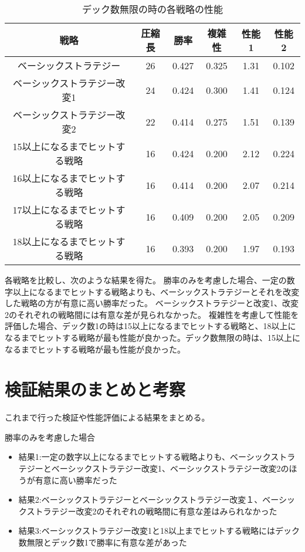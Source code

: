 \begin{table}[H]
\caption{デック数無限の時の各戦略の性能}
\label{table:data_type5}
\begin{center}
\begin{tabular}{|c|c|c|c|c|c|}
\hline
戦略           & 圧縮長 & 勝率    & 複雑性   & 性能1  & 性能2   \\ \hline
ベーシックストラテジー         & 26  & 0.427 & 0.325 & 1.31 & 0.102 \\ \hline
ベーシックストラテジー改変1      & 24  & 0.424 & 0.300  & 1.41 & 0.124 \\ \hline
ベーシックストラテジー改変2      & 22  & 0.414 & 0.275 & 1.51 & 0.139 \\ \hline
15以上になるまでヒットする戦略 & 16  & 0.424 & 0.200 & 2.12 & 0.224 \\ \hline
16以上になるまでヒットする戦略 & 16  & 0.414 & 0.200 & 2.07 & 0.214 \\ \hline
17以上になるまでヒットする戦略 & 16  & 0.409 & 0.200 & 2.05 & 0.209 \\ \hline
18以上になるまでヒットする戦略 & 16  & 0.393 & 0.200 & 1.97 & 0.193 \\ \hline
\end{tabular}
\end{center}
\end{table}

各戦略を比較し、次のような結果を得た。
勝率のみを考慮した場合、一定の数字以上になるまでヒットする戦略よりも、ベーシックストラテジーとそれを改変した戦略の方が有意に高い勝率だった。
ベーシックストラテジーと改変1、改変2のそれぞれの戦略間には有意な差が見られなかった。
複雑性を考慮して性能を評価した場合、デック数1の時は15以上になるまでヒットする戦略と、18以上になるまでヒットする戦略が最も性能が良かった。デック数無限の時は、15以上になるまでヒットする戦略が最も性能が良かった。



\section{検証結果のまとめと考察}
これまで行った検証や性能評価による結果をまとめる。

勝率のみを考慮した場合
\begin{itemize}
\item 結果1:一定の数字以上になるまでヒットする戦略よりも、ベーシックストラテジーとベーシックストラテジー改変1、ベーシックストラテジー改変2のほうが有意に高い勝率だった
\item 結果2:ベーシックストラテジーとベーシックストラテジー改変１、ベーシックストラテジー改変2のそれぞれの戦略間に有意な差はみられなかった
\item 結果3:ベーシックストラテジー改変1と18以上までヒットする戦略にはデック数無限とデック数1で勝率に有意な差があった
\end{itemize}

